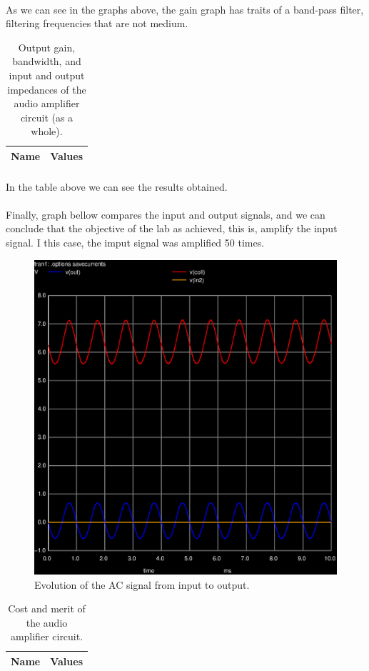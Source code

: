 \paragraph{} As we can see in the graphs above, the gain graph has traits of a band-pass filter, filtering frequencies that are not medium.

\begin{table}[h]
  \centering
  \begin{tabular}{|l|r|}
    \hline    
    {\bf Name} & {\bf Values} \\ \hline
    
         
  \end{tabular}
  \caption{Output gain, bandwidth, and input and output impedances of the audio amplifier circuit (as a whole).}
  \label{tab:main}
\end{table}

\paragraph{} In the table above we can see the results obtained.

\paragraph{} Finally, graph bellow compares the input and output signals, and we can conclude that the objective of the lab as achieved, this is, amplify the input signal. I this case, the imput signal 
was amplified 50 times.

\begin{figure}[!h] \centering
\includegraphics[width=0.6\linewidth]{comp.eps}
\caption{Evolution of the AC signal from input to output.}
\label{fig:comp}
\end{figure}

\begin{table}[h]
  \centering
  \begin{tabular}{|l|r|}
    \hline    
    {\bf Name} & {\bf Values} \\ \hline
     
  \end{tabular}
  \caption{Cost and merit of the audio amplifier circuit.}
  \label{tab:merit}
\end{table}

\clearpage
